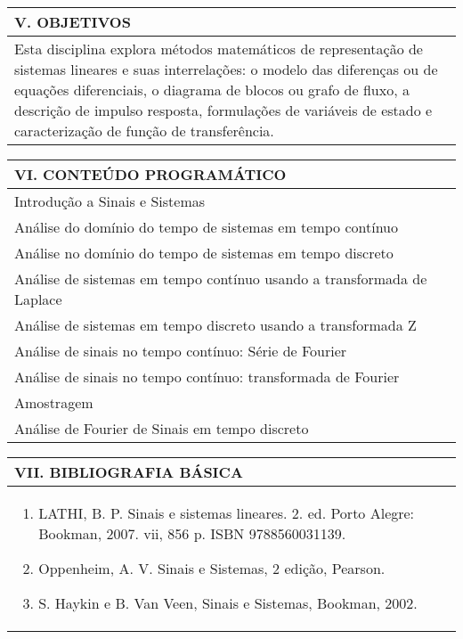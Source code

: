 \documentclass[12pt]{article}
\begin{document}
\begin{longtable}{|L{1.025\textwidth}|} \hline
%
{\bf V. OBJETIVOS } \\ \hline
%
Esta disciplina explora métodos matemáticos de representação de sistemas lineares e suas interrelações: o modelo das diferenças ou de equações diferenciais, o diagrama de blocos ou grafo de fluxo, a descrição de impulso resposta, formulações de variáveis de estado e caracterização de função de transferência.
\\ \hline
\end{longtable}


\begin{longtable}{|L{1.025\textwidth}|} \hline
%
{\bf VI. CONTEÚDO PROGRAMÁTICO } \\ \hline
Introdução a Sinais e Sistemas\\
Análise do domínio do tempo de sistemas em tempo contínuo\\
Análise no domínio do tempo de sistemas em tempo discreto\\
Análise de sistemas em tempo contínuo usando a transformada de Laplace\\
Análise de sistemas em tempo discreto usando a transformada Z\\
Análise de sinais no tempo contínuo: Série de Fourier\\
Análise de sinais no tempo contínuo: transformada de Fourier\\
Amostragem\\
Análise de Fourier de Sinais em tempo discreto

\\ \hline
\end{longtable} 


\begin{longtable}{|L{1.025\textwidth}|} \hline
%
{\bf VII. BIBLIOGRAFIA BÁSICA} \\ \hline
\begin{enumerate}
%
\item LATHI, B. P. Sinais e sistemas lineares. 2. ed. Porto Alegre: Bookman, 2007. vii, 856 p. ISBN 9788560031139.
\item Oppenheim, A. V. Sinais e Sistemas, 2 edição, Pearson.
\item S. Haykin e B. Van Veen, Sinais e Sistemas, Bookman, 2002.
\end{enumerate}
 \\ \hline
\end{longtable}
\end{document}
